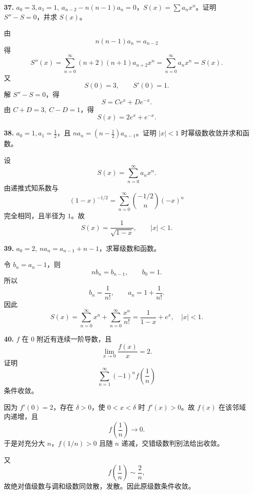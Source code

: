 \begin{problemblock}
\textbf{37.} \(a_0=3,a_1=1,\ a_{n-2}-n(n-1)a_n=0\)，\(S(x)=\sum a_nx^n\)。证明 \(S''-S=0\)，并求 \(S(x)\)。
\end{problemblock}
\begin{solutionblock}
由
\[
n(n-1)a_n=a_{n-2}
\]
得
\[
S''(x)=\sum_{n=0}^{\infty}(n+2)(n+1)a_{n+2}x^n
=\sum_{n=0}^{\infty}a_nx^n=S(x).
\]
又
\[
S(0)=3,\qquad S'(0)=1.
\]
解 \(S''-S=0\)，得
\[
S=C e^x+D e^{-x}.
\]
由 \(C+D=3,\ C-D=1\)，得
\[
\boxed{S(x)=2e^x+e^{-x}}.
\]
\end{solutionblock}

\begin{problemblock}
\textbf{38.} \(a_0=1,a_1=\frac12\)，且 \(n a_n=(n-\frac12)a_{n-1}\)。证明 \(|x|<1\) 时幂级数收敛并求和函数。
\end{problemblock}
\begin{solutionblock}
设
\[
S(x)=\sum_{n=0}^{\infty}a_nx^n.
\]
由递推式知系数与
\[
(1-x)^{-1/2}=\sum_{n=0}^{\infty}\binom{-1/2}{n}(-x)^n
\]
完全相同，且半径为 \(1\)。故
\[
\boxed{S(x)=\frac1{\sqrt{1-x}}},\qquad |x|<1.
\]
\end{solutionblock}

\begin{problemblock}
\textbf{39.} \(a_0=2,\ n a_n=a_{n-1}+n-1\)，求幂级数和函数。
\end{problemblock}
\begin{solutionblock}
令 \(b_n=a_n-1\)，则
\[
n b_n=b_{n-1},\qquad b_0=1.
\]
所以
\[
b_n=\frac1{n!},\qquad a_n=1+\frac1{n!}.
\]
因此
\[
S(x)=\sum_{n=0}^{\infty}x^n+\sum_{n=0}^{\infty}\frac{x^n}{n!}
=\boxed{\frac1{1-x}+e^x},\quad |x|<1.
\]
\end{solutionblock}

\begin{problemblock}
\textbf{40.} \(f\) 在 \(0\) 附近有连续一阶导数，且
\[
\lim_{x\to0}\frac{f(x)}x=2.
\]
证明
\[
\sum_{n=1}^{\infty}(-1)^nf\left(\frac1n\right)
\]
条件收敛。
\end{problemblock}
\begin{solutionblock}
因为 \(f'(0)=2\)，存在 \(\delta>0\)，使 \(0<x<\delta\) 时 \(f'(x)>0\)。故 \(f(x)\) 在该邻域内递增，且
\[
f\left(\frac1n\right)\to0.
\]
于是对充分大 \(n\)，\(f(1/n)>0\) 且随 \(n\) 递减，交错级数判别法给出收敛。

又
\[
f\left(\frac1n\right)\sim\frac2n,
\]
故绝对值级数与调和级数同敛散，发散。因此原级数条件收敛。
\end{solutionblock}

